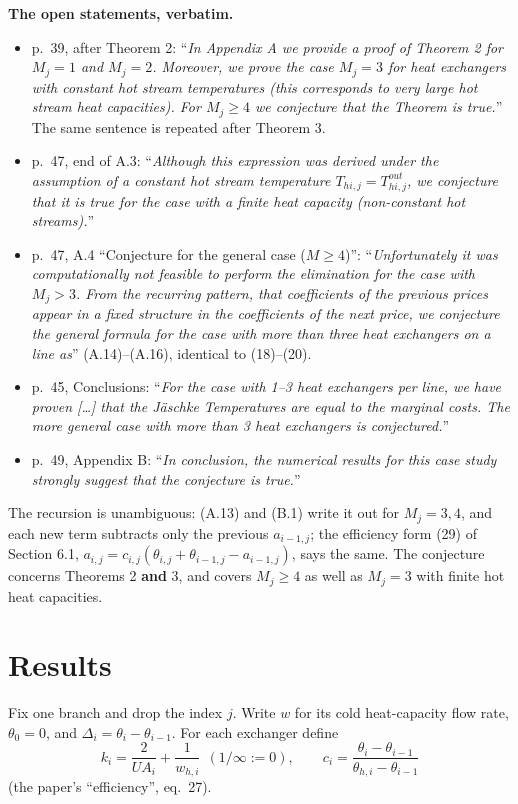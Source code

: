 \documentclass[11pt,a4paper]{report}
\begin{document}
\textbf{The open statements, verbatim.}
\begin{itemize}
\item p.~39, after Theorem 2: ``\emph{In Appendix A we provide a proof of Theorem 2 for \(M_j = 1\) and \(M_j = 2\).
Moreover, we prove the case \(M_j = 3\) for heat exchangers with constant hot stream temperatures (this corresponds to
very large hot stream heat capacities). For \(M_j \ge 4\) we conjecture that the Theorem is true.}'' The same sentence
is repeated after Theorem 3.
\item p.~47, end of A.3: ``\emph{Although this expression was derived under the assumption of a constant hot stream
temperature \(T_{hi,j} = T^{out}_{hi,j}\), we conjecture that it is true for the case with a finite heat capacity
(non-constant hot streams).}''
\item p.~47, A.4 ``Conjecture for the general case (\(M \ge 4\))'': ``\emph{Unfortunately it was computationally not
feasible to perform the elimination for the case with \(M_j > 3\). From the recurring pattern, that coefficients of the
previous prices appear in a fixed structure in the coefficients of the next price, we conjecture the general formula
for the case with more than three heat exchangers on a line as}'' (A.14)--(A.16), identical to (18)--(20).
\item p.~45, Conclusions: ``\emph{For the case with 1--3 heat exchangers per line, we have proven {[}\ldots{]} that the
Jäschke Temperatures are equal to the marginal costs. The more general case with more than 3 heat exchangers is
conjectured.}''
\item p.~49, Appendix B: ``\emph{In conclusion, the numerical results for this case study strongly suggest that the
conjecture is true.}''
\end{itemize}

The recursion is unambiguous: (A.13) and (B.1) write it out for \(M_j = 3, 4\), and each new term subtracts only the
previous \(a_{i-1,j}\); the efficiency form (29) of Section 6.1, \(a_{i,j} = c_{i,j}(\theta_{i,j}+\theta_{i-1,j}-a_{i-1,j})\),
says the same. The conjecture concerns Theorems 2 \textbf{and} 3, and covers \(M_j \ge 4\) as well as \(M_j = 3\) with
finite hot heat capacities.

\section{Results}

Fix one branch and drop the index \(j\). Write \(w\) for its cold heat-capacity flow rate, \(\theta_0 = 0\), and
\(\Delta_i = \theta_i - \theta_{i-1}\). For each exchanger define
\[k_i = \frac{2}{UA_i} + \frac{1}{w_{h,i}} \ \ (1/\infty := 0), \qquad c_i = \frac{\theta_i - \theta_{i-1}}{\theta_{h,i} - \theta_{i-1}}\]
(the paper's ``efficiency'', eq.~27).
\end{document}

